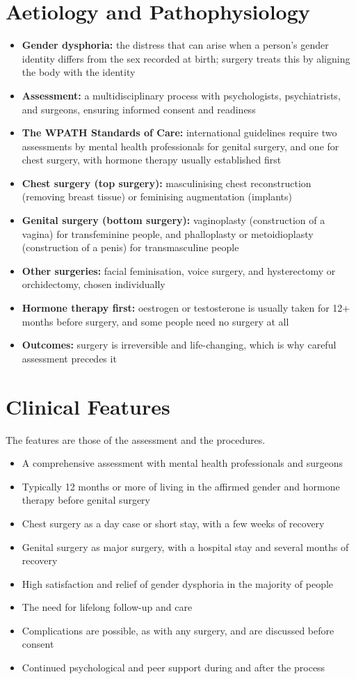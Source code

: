 \section*{Aetiology and Pathophysiology}
\begin{itemize}
    \item \textbf{Gender dysphoria:} the distress that can arise when a person's gender identity differs from the sex recorded at birth; surgery treats this by aligning the body with the identity
    \item \textbf{Assessment:} a multidisciplinary process with psychologists, psychiatrists, and surgeons, ensuring informed consent and readiness
    \item \textbf{The WPATH Standards of Care:} international guidelines require two assessments by mental health professionals for genital surgery, and one for chest surgery, with hormone therapy usually established first
    \item \textbf{Chest surgery (top surgery):} masculinising chest reconstruction (removing breast tissue) or feminising augmentation (implants)
    \item \textbf{Genital surgery (bottom surgery):} vaginoplasty (construction of a vagina) for transfeminine people, and phalloplasty or metoidioplasty (construction of a penis) for transmasculine people
    \item \textbf{Other surgeries:} facial feminisation, voice surgery, and hysterectomy or orchidectomy, chosen individually
    \item \textbf{Hormone therapy first:} oestrogen or testosterone is usually taken for 12+ months before surgery, and some people need no surgery at all
    \item \textbf{Outcomes:} surgery is irreversible and life-changing, which is why careful assessment precedes it
\end{itemize}

\section*{Clinical Features}
The features are those of the assessment and the procedures.
\begin{itemize}
    \item A comprehensive assessment with mental health professionals and surgeons
    \item Typically 12 months or more of living in the affirmed gender and hormone therapy before genital surgery
    \item Chest surgery as a day case or short stay, with a few weeks of recovery
    \item Genital surgery as major surgery, with a hospital stay and several months of recovery
    \item High satisfaction and relief of gender dysphoria in the majority of people
    \item The need for lifelong follow-up and care
    \item Complications are possible, as with any surgery, and are discussed before consent
    \item Continued psychological and peer support during and after the process
\end{itemize}

